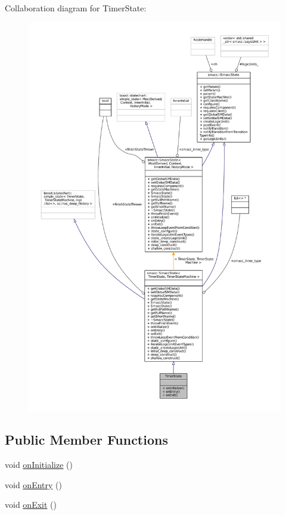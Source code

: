 Collaboration diagram for Timer\+State\+:
\nopagebreak
\begin{figure}[H]
\begin{center}
\leavevmode
\includegraphics[width=350pt]{structTimerState__coll__graph}
\end{center}
\end{figure}
\subsection*{Public Member Functions}
\begin{DoxyCompactItemize}
\item 
void \hyperlink{structTimerState_a5d35a1e08f478a4251221854b79ba020}{on\+Initialize} ()
\item 
void \hyperlink{structTimerState_a470dd79996aa36ad5a57da22d749bec8}{on\+Entry} ()
\item 
void \hyperlink{structTimerState_a2a5f76b47bb83d625f00be8b4daadbf6}{on\+Exit} ()
\end{DoxyCompactItemize}
